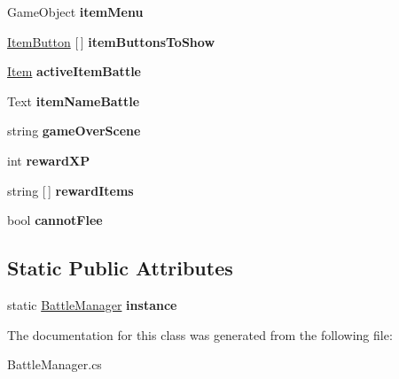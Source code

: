 \begin{DoxyCompactItemize}
Game\+Object {\bfseries item\+Menu}
\item 
\mbox{\label{class_battle_manager_aadd1cab6a140928795e35d3620e69b62}} 
\mbox{\hyperlink{class_item_button}{Item\+Button}} \mbox{[}$\,$\mbox{]} {\bfseries item\+Buttons\+To\+Show}
\item 
\mbox{\label{class_battle_manager_a1537c3e508792123f547327f02f4abe5}} 
\mbox{\hyperlink{class_item}{Item}} {\bfseries active\+Item\+Battle}
\item 
\mbox{\label{class_battle_manager_aabb7b6c830f6a065c82d62a8a3dd3b76}} 
Text {\bfseries item\+Name\+Battle}
\item 
\mbox{\label{class_battle_manager_af3cfd24f605811364e2c26096701af01}} 
string {\bfseries game\+Over\+Scene}
\item 
\mbox{\label{class_battle_manager_abcb3e2b7eb5012290bb7fe7728503f2f}} 
int {\bfseries reward\+XP}
\item 
\mbox{\label{class_battle_manager_af329922166ed97693832aae68dc392e5}} 
string \mbox{[}$\,$\mbox{]} {\bfseries reward\+Items}
\item 
\mbox{\label{class_battle_manager_a91c88c90ac3f32e21e8b8d401b51129d}} 
bool {\bfseries cannot\+Flee}
\end{DoxyCompactItemize}
\subsection*{Static Public Attributes}
\begin{DoxyCompactItemize}
\item 
\mbox{\label{class_battle_manager_a13bd019df69b12ef974d111f888bd0b6}} 
static \mbox{\hyperlink{class_battle_manager}{Battle\+Manager}} {\bfseries instance}
\end{DoxyCompactItemize}


The documentation for this class was generated from the following file\+:\begin{DoxyCompactItemize}
\item 
Battle\+Manager.\+cs\end{DoxyCompactItemize}
